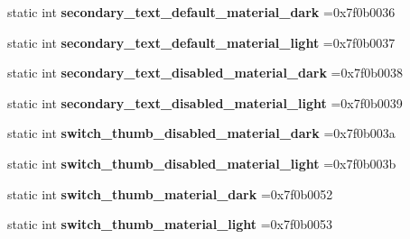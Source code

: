 \begin{DoxyCompactItemize}
static int {\bfseries secondary\+\_\+text\+\_\+default\+\_\+material\+\_\+dark} =0x7f0b0036
\item 
\mbox{\label{classandroid_1_1support_1_1graphics_1_1drawable_1_1R_1_1color_af22fb4cd45d9e0d17b98070c0ddf78dd}} 
static int {\bfseries secondary\+\_\+text\+\_\+default\+\_\+material\+\_\+light} =0x7f0b0037
\item 
\mbox{\label{classandroid_1_1support_1_1graphics_1_1drawable_1_1R_1_1color_a6e0d9b6bc64e2f97db388caf09419a1a}} 
static int {\bfseries secondary\+\_\+text\+\_\+disabled\+\_\+material\+\_\+dark} =0x7f0b0038
\item 
\mbox{\label{classandroid_1_1support_1_1graphics_1_1drawable_1_1R_1_1color_ac661d9a1a0acfe731b45c3b5f4053907}} 
static int {\bfseries secondary\+\_\+text\+\_\+disabled\+\_\+material\+\_\+light} =0x7f0b0039
\item 
\mbox{\label{classandroid_1_1support_1_1graphics_1_1drawable_1_1R_1_1color_adf87560d2560e9fb2313f5380df96ab1}} 
static int {\bfseries switch\+\_\+thumb\+\_\+disabled\+\_\+material\+\_\+dark} =0x7f0b003a
\item 
\mbox{\label{classandroid_1_1support_1_1graphics_1_1drawable_1_1R_1_1color_a6997f087b2dea0fb08cc0f08b8801c89}} 
static int {\bfseries switch\+\_\+thumb\+\_\+disabled\+\_\+material\+\_\+light} =0x7f0b003b
\item 
\mbox{\label{classandroid_1_1support_1_1graphics_1_1drawable_1_1R_1_1color_a338ed23b796a96ae968bc568c8e3de73}} 
static int {\bfseries switch\+\_\+thumb\+\_\+material\+\_\+dark} =0x7f0b0052
\item 
\mbox{\label{classandroid_1_1support_1_1graphics_1_1drawable_1_1R_1_1color_a689f0c8720b5f9f9618d34396426b94e}} 
static int {\bfseries switch\+\_\+thumb\+\_\+material\+\_\+light} =0x7f0b0053
\item 

\end{DoxyCompactItemize}
